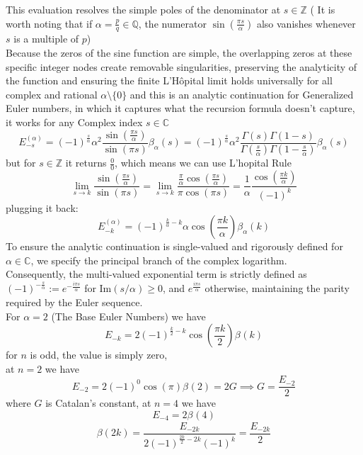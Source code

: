 \documentclass{article}
\begin{document}
This evaluation resolves the simple poles of the denominator at $s \in \mathbb{Z}$ ( It is worth noting that if $\alpha = \frac{p}{q} \in \mathbb{Q}$, the numerator $\sin(\frac{\pi s}{\alpha})$ also vanishes whenever $s$ is a multiple of $p$)\\ 
Because the zeros of the sine function are simple, the overlapping zeros at these specific integer nodes create removable singularities, preserving the analyticity of the function and ensuring the finite L'Hôpital limit holds universally for all complex and rational $\alpha \setminus \{0\}$
and this is an analytic continuation for Generalized Euler numbers, in which it captures what the recursion formula doesn't capture, it works for any Complex index $s\in  \mathbb{C}$
\[E^{(\alpha)}_{-s} = (-1)^{\frac{s}{\alpha}}\alpha^2\frac{\sin(\frac{\pi s}{\alpha})}{\sin(\pi s)}\beta_{\alpha}(s) = (-1)^{\frac{s}{\alpha}}\alpha^2\frac{\Gamma(s)\Gamma(1-s)}{\Gamma(\frac{s}{\alpha})\Gamma(1-\frac{s}{\alpha})}\beta_{\alpha}(s)\]
but for $s\in \mathbb{Z}$ it returns $\frac{0}{0}$, which means we can use L'hopital Rule
\[\lim_{s\to k}\frac{\sin(\frac{\pi s}{\alpha})}{\sin(\pi s)}= \lim_{s\to k}\frac{\frac{\pi}{\alpha}\cos(\frac{\pi s}{\alpha})}{\pi \cos(\pi s)} = \frac{1}{\alpha}\frac{\cos(\frac{\pi k}{\alpha})}{(-1)^k}\]
plugging it back:
\[E^{(\alpha)}_{-k} = (-1)^{\frac{k}{\alpha}-k}\alpha\cos(\frac{\pi k}{\alpha})\beta_{\alpha}(k)\]
To ensure the analytic continuation is single-valued and rigorously defined for $\alpha \in \mathbb{C}$, we specify the principal branch of the complex logarithm.\\ Consequently, the multi-valued exponential term is strictly defined as $(-1)^{-\frac{s}{\alpha}} := e^{-\frac{i\pi s}{\alpha}}$ for Im$(s/\alpha) \ge 0$, and $e^{\frac{i\pi s}{\alpha}}$ otherwise, maintaining the parity required by the Euler sequence.\\
For $\alpha=2$ (The Base Euler Numbers) we have 
\[E_{-k} = 2(-1)^{\frac{k}{2}-k}\cos(\frac{\pi k}{2})\beta_{}(k)\]
for $n$ is odd, the value is simply zero,\\
at $n=2$ we have 
\[E_{-2} = 2(-1)^{0}\cos({\pi})\beta_{}(2) = 2G\implies G =\frac{E_{-2}}{2}\]
where $G$ is Catalan's constant, at $n=4$ we have
\[E_{-4} = 2\beta_{}(4)\]
\[\beta(2k) = \frac{E_{-2k}}{2(-1)^{\frac{2k}{2}-2k}(-1)^{k}} = \frac{E_{-2k}}{2}\]
\end{document}
